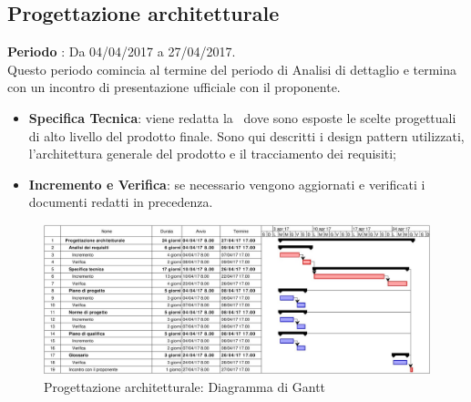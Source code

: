 \documentclass[../PianoDiProgetto.tex]{subfiles}
\begin{document}
		\subsection{Progettazione architetturale}
		\textbf{Periodo} : Da 04/04/2017 a 27/04/2017. \\
		Questo periodo comincia al termine del periodo di Analisi di dettaglio e termina con un incontro di presentazione ufficiale con il proponente.
		\begin{itemize}
			\item \textbf{Specifica Tecnica}: viene redatta la \specificatecnica\ dove sono esposte le scelte progettuali di alto livello del prodotto finale. Sono qui descritti i design pattern utilizzati, l'architettura generale del prodotto e il tracciamento dei requisiti;
			\item \textbf{Incremento e Verifica}: se necessario vengono aggiornati e verificati i documenti redatti in precedenza.
		\end{itemize}
		\begin{figure}[H]
			\centering
			\includegraphics[scale=0.55]{Figures/Gantt_ProgettazioneArchitetturale}
			\caption{Progettazione architetturale: Diagramma di Gantt}
		\end{figure}
		
		
		
\end{document}
